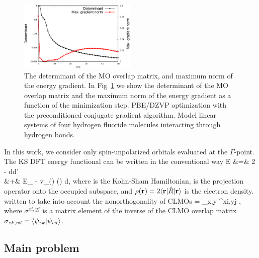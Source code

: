 \documentclass[aps,prl,twocolumn,reprint,amsmath,amssymb]{revtex4-1}
\begin{document}
\begin{figure}
\includegraphics[width=0.5\textwidth]{det}
\caption{
The determinant of the MO overlap matrix, and maximum norm of the energy gradient. In Fig~\ref{fig:det} we show the determinant of the MO overlap matrix and the maximum norm of the energy gradient as a function of the minimization step. PBE/DZVP optimization with the preconditioned conjugate gradient algorithm. Model linear systems of four hydrogen fluoride molecules interacting through hydrogen bonds.}
\label{fig:det}
\end{figure}

In this work, we consider only spin-unpolarized orbitals evaluated at the $\Gamma$-point. The KS DFT energy functional can be written in the conventional way 
\bea
E &=& 2 \trace \left[ \op{R} \op{H} \right] -  \int\int {}d\br d\br' \nonumber \\
 &+& E_{} - \int v_{}(\br) \rho(\br) d\br,
\eea
%
where  is the Kohn-Sham Hamiltonian,  is the projection operator onto the occupied subspace, and $\rho(\mathbf{r}) = 2\langle \mathbf{r} \vert\hat{R}\vert \mathbf{r} \rangle$ is the electron density.  written to take into account the nonorthogonality of CLMOs
\bea \label{eq:dm}
 = \sum_{x,y}  \sigma^{xi,yj} ,
\eea
%
where $\sigma^{xi,yj}$ is a matrix element of the inverse of the CLMO overlap matrix $\sigma_{zk,wl} = \langle  \psi_{zk} \vert  \psi_{wl} \rangle $. %

\subsection{Main problem}
\end{document}
